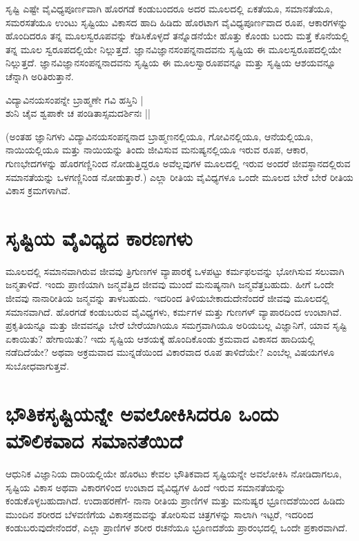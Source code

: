 ಸೃಷ್ಟಿ ಎಷ್ಟೇ ವೈವಿಧ್ಯಪೂರ್ಣವಾಗಿ ಹೊರಗಡೆ ಕಂಡುಬಂದರೂ ಅದರ ಮೂಲದಲ್ಲಿ ಏಕತೆಯೂ, ಸಮಾನತೆಯೂ, ಸಮರಸತೆಯೂ ಉಂಟು ಸೃಷ್ಟಿಯು ವಿಕಾಸದ ಹಾದಿ ಹಿಡಿದು ಹೊರಟಾಗ ವೈವಿಧ್ಯಪೂರ್ಣವಾದ ರೂಪ, ಆಕಾರಗಳನ್ನು ಹೊಂದಿದರೂ ತನ್ನ ಮೂಲಸ್ವರೂಪವನ್ನು ಕೆಡಿಸಿಕೊಳ್ಳದೆ ತನ್ನೊಡನೆಯೇ ಹೊತ್ತು ಕೊಂಡು ಬಂದು ಮತ್ತೆ ಕೊನೆಯಲ್ಲಿ ತನ್ನ ಮೂಲ ಸ್ವರೂಪದಲ್ಲಿಯೇ ನಿಲ್ಲುತ್ತದೆ. ಜ್ಞಾನವಿಜ್ಞಾನಸಂಪನ್ನನಾದವನು ಸೃಷ್ಟಿಯ ಈ ಮೂಲಸ್ವರೂಪದಲ್ಲಿಯೇ ನಿಲ್ಲುತ್ತದೆ. ಜ್ಞಾನವಿಜ್ಞಾನಸಂಪನ್ನನಾದವನು ಸೃಷ್ಟಿಯ ಈ ಮೂಲಸ್ವಾರೂಪವನ್ನೂ ಮತ್ತು ಸೃಷ್ಟಿಯ ಆಶಯವನ್ನೂ ಚೆನ್ನಾಗಿ ಅರಿತಿರುತ್ತಾನೆ.

\begin{shloka}
ವಿದ್ಯಾವಿನಯಸಂಪನ್ನೇ ಬ್ರಾಹ್ಮಣೇ ಗವಿ ಹಸ್ತಿನಿ |\label{67}\\
ಶುನಿ ಚೈವ ಶ್ವಪಾಕೇ ಚ ಪಂಡಿತಾಸ್ಸಮದರ್ಶಿನಃ ||
\end{shloka}

(ಅಂತಹ ಜ್ಞಾನಿಗಳು ವಿದ್ಯಾವಿನಯಸಂಪನ್ನನಾದ ಬ್ರಾಹ್ಮಣನಲ್ಲಿಯೂ, ಗೋವಿನಲ್ಲಿಯೂ, ಆನೆಯಲ್ಲಿಯೂ, ನಾಯಿಯಲ್ಲಿಯೂ ಮತ್ತು ನಾಯಿಯನ್ನು ತಿಂದು ಜೀವಿಸುವ ಮನುಷ್ಯನಲ್ಲಿಯೂ ಇರುವ ರೂಪ, ಆಕಾರ, ಗುಣಭೇದಗಳನ್ನು ಹೊರಗಣ್ಣಿನಿಂದ ನೋಡುತ್ತಿದ್ದರೂ ಅವೆಲ್ಲವುಗಳ ಮೂಲದಲ್ಲಿ ಇರುವ ಅಂದರೆ ಜೀವಸ್ಥಾನದಲ್ಲಿರುವ ಸಮಾನತೆಯನ್ನು ಒಳಗಣ್ಣಿನಿಂಡ ನೋಡುತ್ತಾರೆ.) ಎಲ್ಲಾ ರೀತಿಯ ವೈವಿಧ್ಯಗಳೂ ಒಂದೇ ಮೂಲದ ಬೇರೆ ಬೇರೆ ರೀತಿಯ ವಿಕಾಸ ಕ್ರಮಗಳಾಗಿವೆ.

\section*{ಸೃಷ್ಟಿಯ ವೈವಿಧ್ಯದ ಕಾರಣಗಳು}

ಮೂಲದಲ್ಲಿ ಸಮಾನವಾಗಿರುವ ಜೀವವು ತ್ರಿಗುಣಗಳ ವ್ಯಾಪಾರಕ್ಕೆ ಒಳಪಟ್ಟು ಕರ್ಮಫಲವನ್ನು ಭೋಗಿಸುವ ಸಲುವಾಗಿ ಜನ್ಮತಾಳಿದೆ. ಇಂದು ಪ್ರಾಣಿಯಾಗಿ ಜನ್ಮವೆತ್ತಿದ ಜೀವವು ಮುಂದೆ ಮನುಷ್ಯನಾಗಿ ಜನ್ಮವೆತ್ತಬಹುದು. ಹೀಗೆ ಒಂದೇ ಜೀವವು ನಾನಾರೀತಿಯ ಜನ್ಮವನ್ನು ತಾಳಬಹುದು. ಇದರಿಂದ ತಿಳಿಯಬೇಕಾದುದೇನೆಂದರೆ ಜೀವವು ಮೂಲದಲ್ಲಿ ಸಮಾನವಾಗಿದೆ. ಹೊರಗಡೆ ಕಂಡುಬರುವ ವೈವಿಧ್ಯಗಳು, ಕರ್ಮಗಳ ಮತ್ತು ಗುಣಗಳ್ ವ್ಯಾಪಾರದಿಂದ ಉಂಟಾಗಿವೆ. ಪ್ರಕೃತಿಯನ್ನೂ ಮತ್ತು ಜೀವವನ್ನೂ ಬೇರೆ ಬೇರೆಯಾಗಿಯೂ ಸಮಗ್ರವಾಗಿಯೂ ಅರಿಯಬಲ್ಲ ವಿಜ್ಞಾನಿಗೆ, ಯಾವ ಸೃಷ್ಟಿ ಏಕಾಯಿತು? ಹೇಗಾಯಿತು? ಇದು ಸೃಷ್ಟಿಯ ಆಶಯಕ್ಕೆ ಹೊಂದಿಕೊಂಡು ಕ್ರಮವಾದ ವಿಕಾಸದ ಹಾದಿಯಲ್ಲಿ ನಡೆದಿದೆಯೇ? ಅಥವಾ ಅಕ್ರಮವಾದ ಮುನ್ನಡೆಯಿಂದ ವಿಕಾರವಾದ ರೂಪ ತಾಳಿದೆಯೇ? ಎಂಬೆಲ್ಲ ವಿಷಯಗಳೂ ಸುಬೋಧವಾಗುತ್ತವೆ.

\section*{ಭೌತಿಕಸೃಷ್ಟಿಯನ್ನೇ ಅವಲೋಕಿಸಿದರೂ ಒಂದು ಮೌಲಿಕವಾದ ಸಮಾನತೆಯಿದೆ}

ಆಧುನಿಕ ವಿಜ್ಞಾನಿಯ ದಾರಿಯಲ್ಲಿಯೇ ಹೊರಟು ಕೇವಲ ಭೌತಿಕವಾದ ಸೃಷ್ಟಿಯನ್ನೇ ಅವಲೋಕಿಸಿ ನೋಡಿದಾಗಲೂ, ಸೃಷ್ಟಿಯ ವಿಕಾಸ ಅಥವಾ ವಿಕಾರಗಳಿಂದ ಉಂಟಾದ ವೈವಿಧ್ಯಗಳ ಹಿಂದೆ ಇರುವ ಸಮಾನತೆಯನ್ನು ಕಂಡುಕೊಳ್ಳಬಹುದಾಗಿದೆ. ಉದಾಹರಣೆಗೆ- ನಾನಾ ರೀತಿಯ ಪ್ರಾಣಿಗಳ ಮತ್ತು ಮನುಷ್ಯರ ಭ್ರೂಣದಶೆಯಿಂದ ಹಿಡಿದು ಮುಂದಿನ ಶರೀರದ ಬೆಳವಣಿಗೆಯ ವಿಕಾಸಕ್ರಮವನ್ನು ತೋರಿಸುವ ಚಿತ್ರಗಳನ್ನು ಸಾಲಾಗಿ ಇಟ್ಟರೆ, ಇದರಿಂದ ಕಂಡುಬರುವುದೇನೆಂದರೆ, ಎಲ್ಲಾ ಪ್ರಾಣಿಗಳ ಶರೀರ ರಚನೆಯೂ ಭ್ರೂಣದಶೆಯ ಪ್ರಾರಂಭದಲ್ಲಿ ಒಂದೇ ಪ್ರಕಾರವಾಗಿದೆ.

